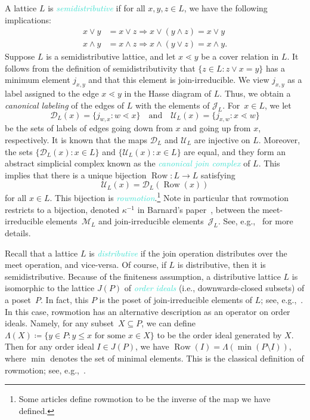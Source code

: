 \documentclass[11pt]{amsart}
\DeclareMathOperator{\row}{Row}
\newcommand{\dfn}[1]{\textcolor{Turquoise}{\emph{#1}}}
\theoremstyle{definition}
\begin{document}
A lattice $L$ is \dfn{semidistributive} if for all $x,y,z\in L$, we have the following implications: 
\begin{align*}
x\vee y &= x\vee z \Longrightarrow x\vee(y\wedge z) = x\vee y \\ 
x\wedge y &= x\wedge z\Longrightarrow x\wedge(y\vee z) = x\wedge y.
\end{align*}
Suppose $L$ is a semidistributive lattice, and let $x\lessdot y$ be a cover relation in $L$. It follows from the definition of semidistributivity that $\{z\in L:z\vee x=y\}$ has a minimum element $j_{x,y}$ and that this element is join-irreducible. We view $j_{x,y}$ as a label assigned to the edge $x\lessdot y$ in the Hasse diagram of $L$. Thus, we obtain a \emph{canonical labeling} of the edges of $L$ with the elements of $\mathcal J_L$. For~$x\in L$, we let \[\mathcal D_L(x)=\{j_{w,x}:w\lessdot x\}\quad\text{and}\quad\mathcal U_L(x)=\{j_{x,w}:x\lessdot w\}\] be the sets of labels of edges going down from $x$ and going up from $x$, respectively. It is known that the maps $\mathcal D_L$ and $\mathcal U_L$ are injective on $L$. Moreover, the sets $\{\mathcal D_L(x):x\in L\}$ and $\{\mathcal U_L(x):x\in L\}$ are equal, and they form an abstract simplicial complex known as the \dfn{canonical join complex} of $L$. This implies that there is a unique bijection $\row\colon L\to L$ satisfying 
\[\mathcal U_L(x)=\mathcal D_L(\row(x))\] 
for all $x\in L$. This bijection is \dfn{rowmotion}.\footnote{Some articles define rowmotion to be the inverse of the map we have defined.} Note in particular that rowmotion restricts to a bijection, denoted $\kappa^{-1}$ in Barnard's paper~\cite{barnard2019canonical}, between the meet-irreducible elements~$\mathcal{M}_L$ and join-irreducible elements~$\mathcal{J}_L$. See, e.g.,~\cite{barnard2019canonical} for more details.

Recall that a lattice $L$ is \dfn{distributive} if the join operation distributes over the meet operation, and vice-versa. Of course, if $L$ is distributive, then it is semidistributive. Because of the finiteness assumption, a distributive lattice $L$ is isomorphic to the lattice $J(P)$ of \dfn{order ideals} (i.e., downwards-closed subsets) of a poset~$P$. In fact, this $P$ is the poset of join-irreducible elements of $L$; see, e.g.,~\cite[Theorem~3.4.1]{stanley2012ec1}. In this case, rowmotion has an alternative description as an operator on order ideals. Namely, for any subset~$X\subseteq P$, we can define $\Lambda(X) \coloneqq \{y\in P:y\leq x\text{ for some }x\in X\}$ to be the order ideal generated by $X$. Then for any order ideal $I \in J(P)$, we have $\row(I)=\Lambda(\min(P\setminus I))$, where $\min$ denotes the set of minimal elements. This is the classical definition of rowmotion; see, e.g.,~\cite{striker2012rowmotion}.
\end{document}
